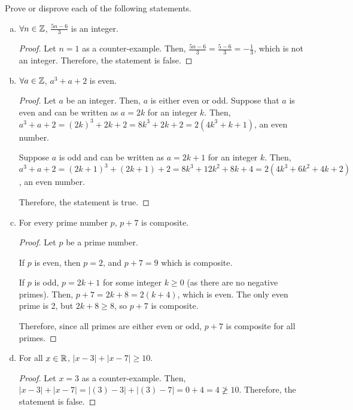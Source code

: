 \question Prove or disprove each of the following statements.
\begin{enumerate}[(a)]
  \item $\forall n\in\mathbb{Z}$, $\frac{5n-6}{3}$ is an integer.
        \begin{proof}
          Let $n=1$ as a counter-example.
          Then, $\frac{5n-6}{3}=\frac{5-6}{3}=-\frac{1}{3}$, which is not an integer.
          Therefore, the statement is false.
        \end{proof}

  \item $\forall a\in\mathbb{Z}$, $a^3+a+2$ is even.
        \begin{proof}
          Let $a$ be an integer. Then, $a$ is either even or odd.
          Suppose that $a$ is even and can be written as $a=2k$ for an integer $k$.
          Then, $a^3+a+2=(2k)^3+2k+2=8k^3+2k+2=2(4k^3+k+1)$, an even number.

          Suppose $a$ is odd and can be written as $a=2k+1$ for an integer $k$.
          Then, $a^3+a+2 = (2k+1)^3 + (2k+1) + 2 = 8k^3 + 12k^2 + 8k + 4 = 2(4k^3 + 6k^2 + 4k + 2)$, an even number.

          Therefore, the statement is true.
        \end{proof}

  \item For every prime number $p$, $p + 7$ is composite.
        \begin{proof}
          Let $p$ be a prime number.

          If $p$ is even, then $p = 2$, and $p + 7 = 9$ which is composite.

          If $p$ is odd, $p = 2k + 1$ for some integer $k \geq 0$ (as there are no negative primes).
          Then, $p + 7 = 2k + 8 = 2(k + 4)$, which is even.
          The only even prime is 2, but $2k + 8 \geq 8$, so $p + 7$ is composite.

          Therefore, since all primes are either even or odd, $p + 7$ is composite for all primes.
        \end{proof}

  \item For all $x \in \mathbb{R}$, $|x-3| + |x-7| \geq 10$.
        \begin{proof}
          Let $x=3$ as a counter-example.
          Then, $|x-3|+|x-7|=|(3)-3|+|(3)-7|=0+4=4 \not\geq 10$.
          Therefore, the statement is false.
        \end{proof}


\end{enumerate}
